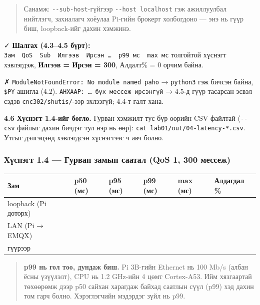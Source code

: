 \begin{quote}
Санамж: \texttt{-\/-sub-host}-гүйгээр \texttt{-\/\allowbreak{}-host\ localhost} гэж ажиллуулбал нийтлэгч, захиалагч хоёулаа Pi-гийн брокерт холбогдоно --- энэ нь гүүр биш, loopback-ийг дахин хэмжинэ.
\end{quote}

✓ \textbf{Шалгах (4.3--4.5 бүрт):} \texttt{Зам\ \ QoS\ \ Sub\ \ Илгээв\ \ Ирсэн\ \ldots{}\ \ p99\ мс\ \ max\ мс} толгойтой хүснэгт хэвлэгдэж, \textbf{Илгээв = Ирсэн = 300}, Алдалт\% = 0 орчим байна.

✗ \texttt{ModuleNotFoundError:\ No\ module\ named\ \textquotesingle{}paho\textquotesingle{}} → \texttt{python3} гэж бичсэн байна, \texttt{\$PY} ашигла (4.2). \texttt{АНХААР:\allowbreak{}\ \ldots{}\ бүх\ мессеж\ ирсэнгүй} → 4.5-д гүүр тасарсан эсвэл сэдэв \texttt{cnc302/shutis/}-ээр эхлээгүй; 4.4-т галт хана.

\textbf{4.6 Хүснэгт 1.4-ийг бөглө.} Гурван хэмжилт тус бүр өөрийн CSV файлтай (\texttt{-\/-csv} файлыг дахин бичдэг тул нэр нь өөр): \texttt{cat\ lab01/\allowbreak{}out/\allowbreak{}04-latency-*.\allowbreak{}csv}. Утгыг дэлгэцэнд хэвлэгдсэн хүснэгтээс ч авч болно.

\hypertarget{ux445ux4afux441ux43dux44dux433ux442-1.4-ux433ux443ux440ux432ux430ux43d-ux437ux430ux43cux44bux43d-ux441ux430ux430ux442ux430ux43b-qos-1-300-ux43cux435ux441ux441ux435ux436}{%
\subsubsection{Хүснэгт 1.4 --- Гурван замын саатал (QoS 1, 300 мессеж)}\label{ux445ux4afux441ux43dux44dux433ux442-1.4-ux433ux443ux440ux432ux430ux43d-ux437ux430ux43cux44bux43d-ux441ux430ux430ux442ux430ux43b-qos-1-300-ux43cux435ux441ux441ux435ux436}}

\begingroup\scriptsize\begin{longtable}[]{@{}llllll@{}}
\toprule
Зам & p50 (мс) & p95 (мс) & \textbf{p99 (мс)} & max (мс) & Алдагдал \%\tabularnewline
\midrule
\endhead
loopback (Pi доторх) & & & & &\tabularnewline
LAN (Pi → EMQX) & & & & &\tabularnewline
гүүрээр & & & & &\tabularnewline
\bottomrule
\end{longtable}\endgroup

\begin{quote}
\textbf{p99 нь гол тоо, дундаж биш.} Pi 3B-гийн Ethernet нь 100 Mb/s (албан ёсны үзүүлэлт), CPU нь 1.2 GHz-ийн 4 цөмт Cortex-A53. Ийм хязгаартай төхөөрөмж дээр p50 сайхан харагдаж байхад саатлын сүүл (p99) хэд дахин том гарч болно. Хэрэглэгчийн мэдэрдэг зүйл нь p99.
\end{quote}


